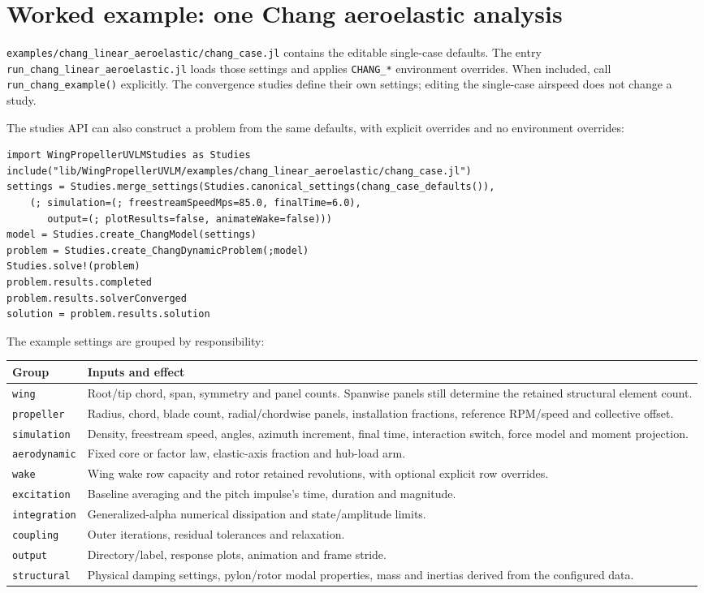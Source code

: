 \documentclass[11pt,a4paper]{article}
\newcommand{\code}{\nolinkurl}
\begin{document}
\section{Worked example: one Chang aeroelastic analysis}

\code{examples/chang_linear_aeroelastic/chang_case.jl} contains the editable
single-case defaults. The entry \code{run_chang_linear_aeroelastic.jl} loads
those settings and applies \code{CHANG_*} environment overrides. When included,
call \code{run_chang_example()} explicitly.
The convergence studies define their own settings; editing the single-case
airspeed does not change a study.

The studies API can also construct a problem from the same defaults, with
explicit overrides and no environment overrides:
\begin{lstlisting}
import WingPropellerUVLMStudies as Studies
include("lib/WingPropellerUVLM/examples/chang_linear_aeroelastic/chang_case.jl")
settings = Studies.merge_settings(Studies.canonical_settings(chang_case_defaults()),
    (; simulation=(; freestreamSpeedMps=85.0, finalTime=6.0),
       output=(; plotResults=false, animateWake=false)))
model = Studies.create_ChangModel(settings)
problem = Studies.create_ChangDynamicProblem(;model)
Studies.solve!(problem)
problem.results.completed
problem.results.solverConverged
solution = problem.results.solution
\end{lstlisting}

The example settings are grouped by responsibility:
\begin{longtable}{@{}L{.20\linewidth}L{.72\linewidth}@{}}
\toprule Group & Inputs and effect\\\midrule\endhead
\code{wing} & Root/tip chord, span, symmetry and panel counts. Spanwise panels still determine the retained structural element count.\\
\code{propeller} & Radius, chord, blade count, radial/chordwise panels, installation fractions, reference RPM/speed and collective offset.\\
\code{simulation} & Density, freestream speed, angles, azimuth increment, final time, interaction switch, force model and moment projection.\\
\code{aerodynamic} & Fixed core or factor law, elastic-axis fraction and hub-load arm.\\
\code{wake} & Wing wake row capacity and rotor retained revolutions, with optional explicit row overrides.\\
\code{excitation} & Baseline averaging and the pitch impulse's time, duration and magnitude.\\
\code{integration} & Generalized-alpha numerical dissipation and state/amplitude limits.\\
\code{coupling} & Outer iterations, residual tolerances and relaxation.\\
\code{output} & Directory/label, response plots, animation and frame stride.\\
\code{structural} & Physical damping settings, pylon/rotor modal properties, mass and inertias derived from the configured data.\\
\bottomrule
\end{longtable}
\end{document}
